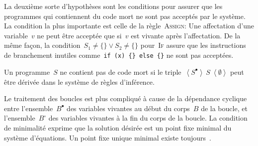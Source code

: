 \documentclass[a4paper]{easychair}
\newcommand{\liveout}[1]{\ensuremath{#1^{\circ}}}
\newcommand{\livein}[1]{\ensuremath{#1^{\bullet}}}
\newcommand{\triple}[3]{\ensuremath{
    \left\langle#1\right\rangle \ #2 \ \left\langle#3\right\rangle
}}
\begin{document}
La deuxième sorte d'hypothèses sont les conditions pour assurer que les
programmes qui contiennent du code mort ne sont pas acceptés par le système.
La condition la plus importante est celle de la règle~\textsc{Assign}: Une
affectation d'une variable~\(v\) ne peut être acceptée que si~\(v\) est
vivante après l'affectation. De la même façon, la condition~\(S_1 \neq \{\}
\lor S_2 \neq \{\}\) pour~\textsc{If} assure que les instructions de
branchement inutiles comme~\texttt{if (x) \{\} else \{\}} ne sont pas
acceptées.

Un programme~\(S\) ne contient pas de code mort si le
triple~\(\triple{\livein{S}}{S}{\emptyset}\) peut être dérivée dans le
système de règles d'inférence.


Le traitement des boucles est plus compliqué à cause de la dépendance
cyclique entre l'ensemble~\(\livein{B}\) des variables vivantes au début du
corps~\(B\) de la boucle, et l'ensemble~\(\liveout{B}\) des variables
vivantes à la fin du corps de la boucle. La condition de minimalité exprime
que la solution désirée est un point fixe minimal du système d'équations.
Un point fixe unique minimal existe toujours~\cite{nielson.etal-1999}.
\end{document}
